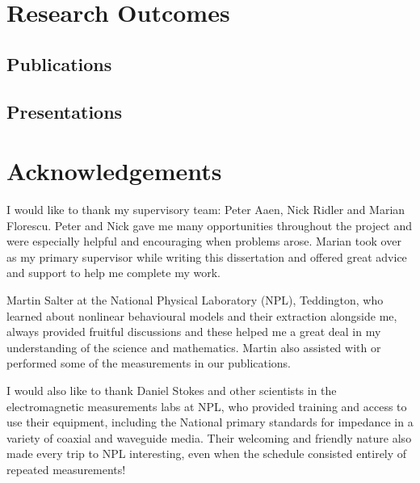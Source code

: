 \documentclass[../thesis/thesis.tex]{subfiles}
\begin{document}
\chapter*{Research Outcomes}
\vspace{-5mm}
\begin{refsection}
\section*{Publications}
\nocite{Votsi_2020, Salter_2018, Stant_2018_TMTT, Stant_2017, Stant_2016, Stant_2016_Coll}
\printbibliography[heading=none]
\end{refsection}
\vspace{-5mm}
\begin{refsection}
\section*{Presentations}
\nocite{Stant_2017_pgi, Stant_2017_feps, Stant_2016_pg, Stant_2016_Coll2}
\printbibliography[heading=none]
\end{refsection}
\chapter*{Acknowledgements}
I would like to thank my supervisory team: Peter Aaen, Nick Ridler and Marian Florescu. Peter and Nick gave me many opportunities throughout the project and were especially helpful and encouraging when problems arose. Marian took over as my primary supervisor while writing this dissertation and offered great advice and support to help me complete my work.

Martin Salter at the National Physical Laboratory (NPL), Teddington, who learned about nonlinear behavioural models and their extraction alongside me, always provided fruitful discussions and these helped me a great deal in my understanding of the science and mathematics. Martin also assisted with or performed some of the measurements in our publications.

I would also like to thank Daniel Stokes and other scientists in the electromagnetic measurements labs at NPL, who provided training and access to use their equipment, including the National primary standards for impedance in a variety of coaxial and waveguide media. Their welcoming and friendly nature also made every trip to NPL interesting, even when the schedule consisted entirely of repeated measurements!
\end{document}
